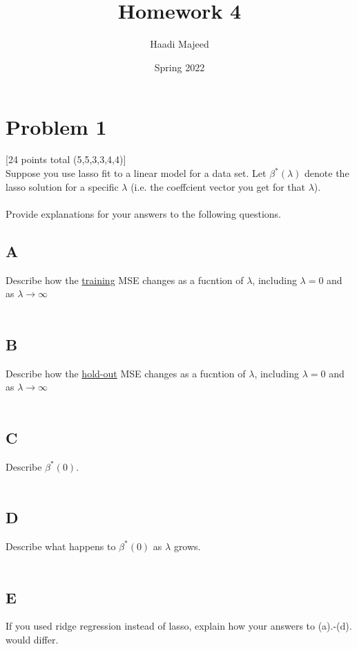 \documentclass[12pt]{article}
\title{ \course \\\large Homework 4 }
\author{ Haadi Majeed }
\date{Spring 2022}
\begin{document}
\maketitle
\pagebreak

\pagebreak
\section{Problem 1}
 [24 points total (5,5,3,3,4,4)]\\
Suppose you use lasso fit to a linear model for a data set. Let $\beta^*(\lambda)$ denote the lasso solution for a specific $\lambda$ (i.e. the coeffcient vector you get for that $\lambda$).
\\\\Provide explanations for your answers to the following questions.

\subsection{A}
Describe how the \underline{training} MSE changes as a fucntion of $\lambda$, including $\lambda = 0$ and as $\lambda \rightarrow \infty$\\\\

\subsection{B}
Describe how the \underline{hold-out} MSE changes as a fucntion of $\lambda$, including $\lambda = 0$ and as $\lambda \rightarrow \infty$\\\\


\subsection{C}
Describe $\beta^*(0)$.\\\\

\subsection{D}
Describe what happens to $\beta^*(0)$ as $\lambda$ grows.\\\\

\subsection{E}
If you used ridge regression instead of lasso, explain how your answers to (a).-(d). would differ. \\\\
\end{document}

